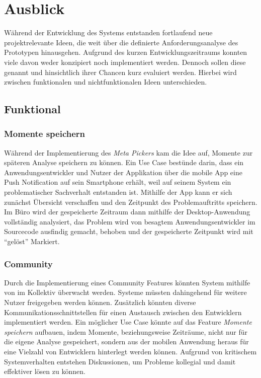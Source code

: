 \section{Ausblick}

Während der Entwicklung des Systems entstanden fortlaufend neue projektrelevante Ideen,
die weit über die definierte Anforderungsanalyse des Prototypen hinausgehen.
Aufgrund des kurzen Entwicklungszeitraums konnten viele davon weder konzipiert noch implementiert werden.
Dennoch sollen diese genannt und hinsichtlich ihrer Chancen kurz evaluiert werden.
Hierbei wird zwischen funktionalen und nichtfunktionalen Ideen unterschieden.

\subsection{Funktional}

\subsubsection{Momente speichern}

Während der Implementierung des \emph{Meta Pickers} kam die Idee auf, Momente zur späteren Analyse speichern zu können.
Ein Use Case bestünde darin, dass ein Anwendungsentwickler und Nutzer der Applikation \projectname{}
über die mobile App eine Push Notification auf sein Smartphone erhält, weil auf seinem System ein problematischer Sachverhalt
entstanden ist. Mithilfe der App kann er sich zunächst Übersicht verschaffen und den Zeitpunkt des Problemauftritts speichern.
Im Büro wird der gespeicherte Zeitraum dann mithilfe der Desktop-Anwendung vollständig analysiert,
das Problem wird von besagtem Anwendungsentwickler im Sourcecode ausfindig gemacht, behoben und der gespeicherte Zeitpunkt wird mit ``gelöst'' Markiert.

\subsubsection{Community}

Durch die Implementierung eines Community Features könnten System mithilfe von \projectname{} im Kollektiv überwacht werden.
Systeme müssten dahingehend für weitere Nutzer freigegeben werden können.
Zusätzlich könnten diverse Kommunikationsschnittstellen für einen
Austausch zwischen den Entwicklern implementiert werden. Ein möglicher Use Case könnte auf das Feature
\emph{Momente speichern} aufbauen,
indem Momente, beziehungsweise Zeiträume, nicht nur für die eigene Analyse gespeichert, sondern aus der mobilen Anwendung heraus
für eine Vielzahl von Entwicklern hinterlegt werden können.
Aufgrund von kritischem Systemverhalten entstehen Diskussionen, um Probleme kollegial und damit effektiver lösen zu können.

